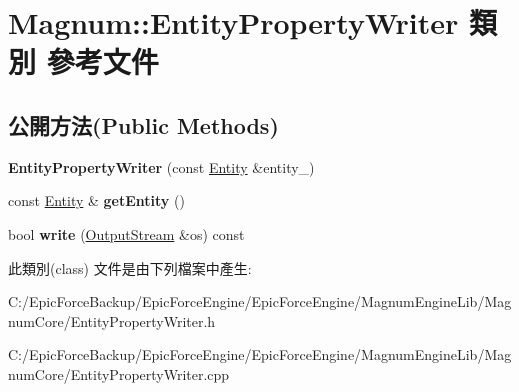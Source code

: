 \hypertarget{class_magnum_1_1_entity_property_writer}{}\section{Magnum\+:\+:Entity\+Property\+Writer 類別 參考文件}
\label{class_magnum_1_1_entity_property_writer}
\subsection*{公開方法(Public Methods)}
\begin{DoxyCompactItemize}
\item 
{\bfseries Entity\+Property\+Writer} (const \hyperlink{class_magnum_1_1_entity}{Entity} \&entity\+\_\+)\hypertarget{class_magnum_1_1_entity_property_writer_a1a1c74d08dc7f507c42cacd470656ea5}{}\label{class_magnum_1_1_entity_property_writer_a1a1c74d08dc7f507c42cacd470656ea5}

\item 
const \hyperlink{class_magnum_1_1_entity}{Entity} \& {\bfseries get\+Entity} ()\hypertarget{class_magnum_1_1_entity_property_writer_a8fd514f42524c9c9b9d4dc5d4b01f49f}{}\label{class_magnum_1_1_entity_property_writer_a8fd514f42524c9c9b9d4dc5d4b01f49f}

\item 
bool {\bfseries write} (\hyperlink{class_magnum_1_1_output_stream}{Output\+Stream} \&os) const \hypertarget{class_magnum_1_1_entity_property_writer_abad55018a0194d7fa50e101feafee62f}{}\label{class_magnum_1_1_entity_property_writer_abad55018a0194d7fa50e101feafee62f}

\end{DoxyCompactItemize}


此類別(class) 文件是由下列檔案中產生\+:\begin{DoxyCompactItemize}
\item 
C\+:/\+Epic\+Force\+Backup/\+Epic\+Force\+Engine/\+Epic\+Force\+Engine/\+Magnum\+Engine\+Lib/\+Magnum\+Core/Entity\+Property\+Writer.\+h\item 
C\+:/\+Epic\+Force\+Backup/\+Epic\+Force\+Engine/\+Epic\+Force\+Engine/\+Magnum\+Engine\+Lib/\+Magnum\+Core/Entity\+Property\+Writer.\+cpp\end{DoxyCompactItemize}
